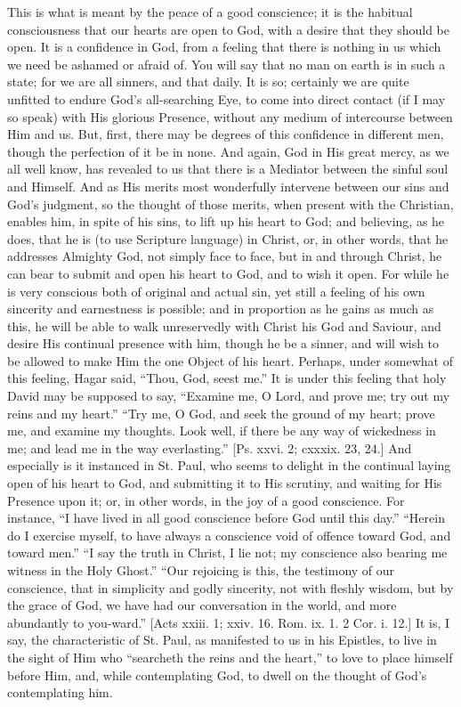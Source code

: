 This is what is meant by the peace of a good conscience; it is the
habitual consciousness that our hearts are open to God, with a desire
that they should be open. It is a confidence in God, from a feeling
that there is nothing in us which we need be ashamed or afraid of. You
will say that no man on earth is in such a state; for we are all
sinners, and that daily. It is so; certainly we are quite unfitted to
endure God's all-searching Eye, to come into direct contact (if I may
so speak) with His glorious Presence, without any medium of
intercourse between Him and us. But, first, there may be degrees of
this confidence in different men, though the perfection of it be in
none. And again, God in His great mercy, as we all well know, has
revealed to us that there is a Mediator between the sinful soul and
Himself. And as His merits most wonderfully intervene between our sins
and God's judgment, so the thought of those merits, when present with
the Christian, enables him, in spite of his sins, to lift up his heart
to God; and believing, as he does, that he is (to use Scripture
language) in Christ, or, in other words, that he addresses Almighty
God, not simply face to face, but in and through Christ, he can bear
to submit and open his heart to God, and to wish it open. For while he
is very conscious both of original and actual sin, yet still a feeling
of his own sincerity and earnestness is possible; and in proportion as
he gains as much as this, he will be able to walk unreservedly with
Christ his God and Saviour, and desire His continual presence with
him, though he be a sinner, and will wish to be allowed to make Him
the one Object of his heart. Perhaps, under somewhat of this feeling,
Hagar said, ``Thou, God, seest me.'' It is under this feeling
that holy David may be supposed to say, ``Examine me, O Lord, and
prove me; try out my reins and my heart.'' ``Try me, O God,
and seek the ground of my heart; prove me, and examine my thoughts.
Look well, if there be any way of wickedness in me; and lead me in the
way everlasting.'' [Ps. xxvi. 2; cxxxix. 23, 24.] And especially
is it instanced in St. Paul, who seems to delight in the continual
laying open of his heart to God, and submitting it to His scrutiny,
and waiting for His Presence upon it; or, in other words, in the joy
of a good conscience. For instance, ``I have lived in all good
conscience before God until this day.'' ``Herein do I exercise
myself, to have always a conscience void of offence toward God, and
toward men.'' ``I say the truth in Christ, I lie not; my
conscience also bearing me witness in the Holy Ghost.'' ``Our
rejoicing is this, the testimony of our conscience, that in simplicity
and godly sincerity, not with fleshly wisdom, but by the grace of God,
we have had our conversation in the world, and more abundantly to
you-ward.'' [Acts xxiii. 1; xxiv. 16. Rom. ix. 1. 2 Cor. i. 12.] It is,
I say, the characteristic of St. Paul, as manifested to us in his
Epistles, to live in the sight of Him who ``searcheth the reins
and the heart,'' to love to place himself before Him, and, while
contemplating God, to dwell on the thought of God's contemplating him.

